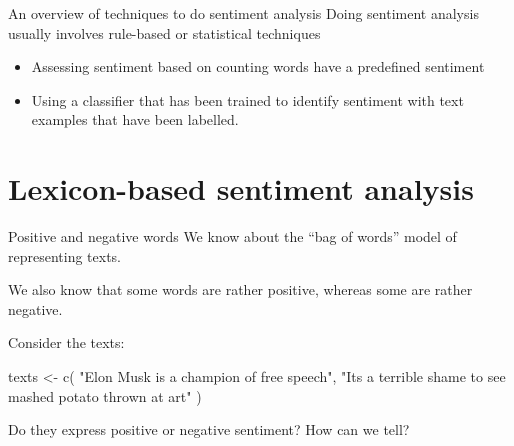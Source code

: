 \documentclass[
  10pt,
  ignorenonframetext,
  aspectratio=169]{beamer}
\newenvironment{Shaded}{\begin{snugshade}}{\end{snugshade}}
\newcommand{\FunctionTok}[1]{\textcolor[rgb]{0.94,0.94,0.56}{#1}}
\newcommand{\NormalTok}[1]{\textcolor[rgb]{0.80,0.80,0.80}{#1}}
\newcommand{\OtherTok}[1]{\textcolor[rgb]{0.94,0.94,0.56}{#1}}
\newcommand{\StringTok}[1]{\textcolor[rgb]{0.80,0.58,0.58}{#1}}
\begin{document}
\begin{frame}{An overview of techniques to do sentiment analysis}
\protect\hypertarget{an-overview-of-techniques-to-do-sentiment-analysis}{}
Doing sentiment analysis usually involves rule-based or statistical
techniques

\begin{itemize}
  \item<1->Assessing sentiment based on counting words have a predefined sentiment
  \item<2->Using a classifier that has been trained to identify sentiment with text examples that have been labelled.
\end{itemize}
\end{frame}

\hypertarget{lexicon-based-sentiment-analysis}{%
\section{Lexicon-based sentiment
analysis}\label{lexicon-based-sentiment-analysis}}

\begin{frame}[fragile]{Positive and negative words}
\protect\hypertarget{positive-and-negative-words}{}
We know about the ``bag of words'' model of representing texts.

We also know that some words are rather positive, whereas some are
rather negative.

Consider the texts:

\medskip

\begin{Shaded}
\begin{Highlighting}[]
\NormalTok{texts }\OtherTok{\textless{}{-}} \FunctionTok{c}\NormalTok{(}
  \StringTok{"Elon Musk is a champion of free speech"}\NormalTok{,}
  \StringTok{"It\textquotesingle{}s a terrible shame to see mashed potato thrown at art"}
\NormalTok{)}
\end{Highlighting}
\end{Shaded}

\medskip

Do they express positive or negative sentiment? How can we tell?
\end{frame}
\end{document}
